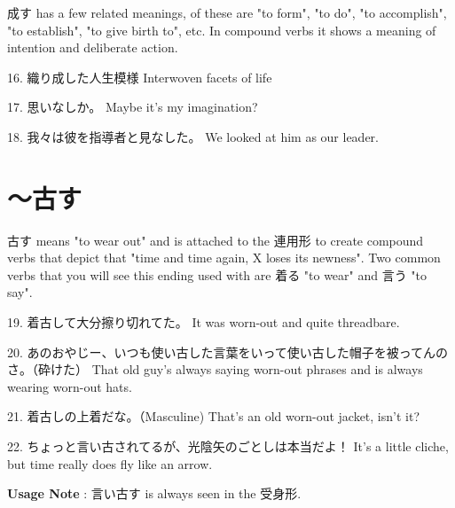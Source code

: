 \par{ 成す has a few related meanings, of these are "to form", "to do", "to accomplish", "to establish", "to give birth to", etc. In compound verbs it shows a meaning of intention and deliberate action. }

\par{16. 織り成した人生模様 \hfill\break
Interwoven facets of life }

\par{17. 思いなしか。 \hfill\break
Maybe it's my imagination? \hfill\break
}

\par{18. 我々は彼を指導者と見なした。 \hfill\break
We looked at him as our leader. }
      
\section{～古す}
 
\par{ 古す means "to wear out" and is attached to the 連用形 to create compound verbs that depict that "time and time again, X loses its newness". Two common verbs that you will see this ending used with are 着る "to wear" and 言う "to say". }

\par{19. 着古して大分擦り切れてた。 \hfill\break
It was worn-out and quite threadbare. }

\par{20. あのおやじー、いつも使い古した言葉をいって使い古した帽子を被ってんのさ。（砕けた） \hfill\break
That old guy's always saying worn-out phrases and is always wearing worn-out hats. }

\par{21. 着古しの上着だな。（Masculine) \hfill\break
That's an old worn-out jacket, isn't it? }

\par{22. ちょっと言い古されてるが、光陰矢のごとしは本当だよ！ \hfill\break
It's a little cliche, but time really does fly like an arrow. }

\par{\textbf{Usage Note }: 言い古す is always seen in the 受身形. }
    